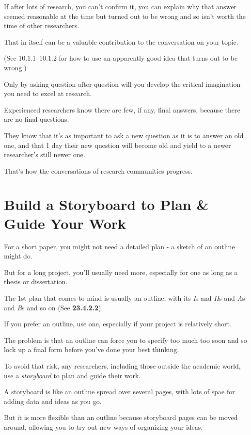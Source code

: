 \documentclass[oneside]{book}
\numberwithin{equation}{section}
\begin{document}
If after lots of research, you can't confirm it, you can explain why that answer seemed reasonable at the time but turned out to be wrong and so isn't worth the time of other researchers.

That in itself can be a valuable contribution to the conversation on your topic.

(See 10.1.1--10.1.2 for how to use an apparently good idea that turns out to be wrong.)

%
Only by asking question after question will you develop the critical imagination you need to excel at research.

Experienced researchers know there are few, if any, final answers, because there are no final questions.

They know that it's as important to ask a new question as it is to answer an old one, and that 1 day their new question will become old and yield to a newer researcher's still newer one.

That's how the conversations of research communities progress.

\section{Build a Storyboard to Plan \& Guide Your Work}
For a short paper, you might not need a detailed plan - a sketch of an outline might do.

But for a long project, you'll usually need more, especially for one as long as a thesis or dissertation.

The 1st plan that comes to mind is usually an outline, with its \textit{I}s and \textit{II}s and \textit{A}s and \textit{B}s and so on (See \textbf{23.4.2.2}).

If you prefer an outline, use one, especially if your project is relatively short.

The problem is that an outline can force you to specify too much too soon and so lock up a final form before you've done your best thinking.

%
To avoid that risk, any researchers, including those outside the academic world, use a \textit{storyboard} to plan and guide their work.

A storyboard is like an outline spread over several pages, with lots of spae for adding data and ideas as you go.

But it is more flexible than an outline because storyboard pages can be moved around, allowing you to try out new ways of organizing your ideas.
\end{document}
